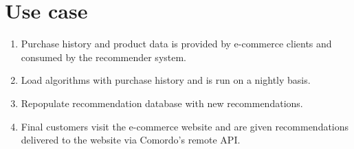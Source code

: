 
\section{Use case}\label{sec:use}

\begin{enumerate}
    \item Purchase history and product data is provided by e-commerce clients and consumed by the recommender system.
    \item Load algorithms with purchase history and is run on a nightly basis.
    \item Repopulate recommendation database with new recommendations.
    \item Final customers visit the e-commerce website and are given recommendations delivered to the website via Comordo's remote API.
\end{enumerate}

